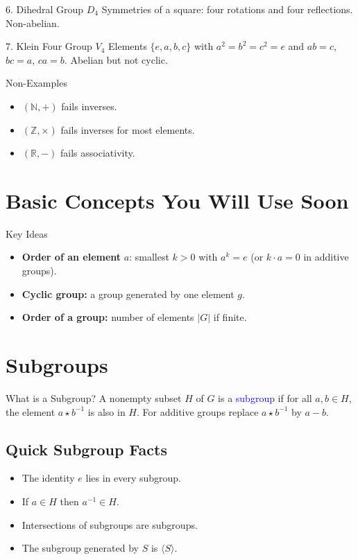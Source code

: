 \documentclass[12pt]{article}
\begin{document}
\begin{examplebox}{6. Dihedral Group $D_4$}
Symmetries of a square: four rotations and four reflections. Non-abelian.
\end{examplebox}

\begin{examplebox}{7. Klein Four Group $V_4$}
Elements $\{e,a,b,c\}$ with $a^2=b^2=c^2=e$ and $ab=c$, $bc=a$, $ca=b$. Abelian but not cyclic.
\end{examplebox}

\begin{warnbox}{Non-Examples}
\begin{itemize}
  \item $(\mathbb{N},+)$ fails inverses.
  \item $(\mathbb{Z},\times)$ fails inverses for most elements.
  \item $(\mathbb{R},-)$ fails associativity.
\end{itemize}
\end{warnbox}

\section*{Basic Concepts You Will Use Soon}
\begin{definitionbox}{Key Ideas}
\begin{itemize}
  \item \textbf{Order of an element} $a$: smallest $k>0$ with $a^k=e$ (or $k\cdot a=0$ in additive groups).
  \item \textbf{Cyclic group:} a group generated by one element $g$.
  \item \textbf{Order of a group:} number of elements $|G|$ if finite.
\end{itemize}
\end{definitionbox}

\section*{Subgroups}
\begin{definitionbox}{What is a Subgroup?}
A nonempty subset $H$ of $G$ is a \textcolor{blue}{subgroup} if for all $a,b\in H$, the element $a\star b^{-1}$ is also in $H$. For additive groups replace $a\star b^{-1}$ by $a-b$.
\end{definitionbox}

\subsection*{Quick Subgroup Facts}
\begin{itemize}
  \item The identity $e$ lies in every subgroup.
  \item If $a\in H$ then $a^{-1}\in H$.
  \item Intersections of subgroups are subgroups.
  \item The subgroup generated by $S$ is $\langle S\rangle$.
\end{itemize}
\end{document}
